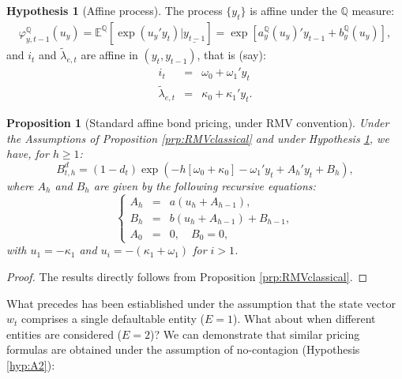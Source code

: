 \documentclass[
  12pt,
]{book}
\newtheorem{proposition}{Proposition}[chapter]
\theoremstyle{definition}
\theoremstyle{definition}
\theoremstyle{definition}
\theoremstyle{definition}
\newtheorem{hypothesis}{Hypothesis}[chapter]
\theoremstyle{remark}
\begin{document}
\begin{hypothesis}[Affine process]
\protect\hypertarget{hyp:A6}{}\label{hyp:A6}The process \(\{ y_t \}\) is affine under the \(\mathbb{Q}\) measure:
\begin{equation}
\begin{array}{lll}
\varphi^{\mathbb{Q}}_{y, t-1} (u_y) = \mathbb{E}^{\mathbb{Q}} \left[\exp( u_y ' y_t )   |   \underline{y_{t-1}} \right]
= \exp \left[ a^{\mathbb{Q}}_{y} (u_{y}) ' y_{t-1} + b^{\mathbb{Q}}_{y} (u_{y}) \right],
\end{array}\label{eq:affineyPcLT}
\end{equation}
and \(i_t\) and \(\widetilde{\lambda}_{e, t}\) are affine in \((y_t, y_{t-1})\), that is (say):
\begin{eqnarray}
i_{t} &=& \omega_0 + \omega_{1} ' y_{t} \\
\widetilde{\lambda}_{e, t} &=& \kappa_{0} + \kappa_{1}' y_t.
\end{eqnarray}
\end{hypothesis}

\begin{proposition}[Standard affine bond pricing, under RMV convention]
\protect\hypertarget{prp:standardCreditFormula}{}\label{prp:standardCreditFormula}Under the Assumptions of Proposition \ref{prp:RMVclassical} and under Hypothesis \ref{hyp:A6}, we have, for \(h \ge 1\):
\begin{equation}
B_{t,h}^d = \left(1 - d_{t} \right)\exp(- h[\omega_0 + \kappa_{0}] - \omega_{1} ' y_{t} + A_h'y_t + B_h),\label{eq:standardAffineCredit}
\end{equation}
where \(A_h\) and \(B_h\) are given by the following recursive equations:
\begin{equation}
\left\{
\begin{array}{ccl}
A_{h} &=& a(u_{h} + A_{h-1}), \\
B_{h} &=& b(u_{h} + A_{h-1}) + B_{h-1}, \\
A_{0} &=& 0,\quad  B_{0} = 0,
\end{array}
\right.\label{eq:auxRecursiveStandardCredit}
\end{equation}
with \(u_1 = -\kappa_{1}\) and \(u_i = -(\kappa_{1} + \omega_{1})\) for \(i>1\).
\end{proposition}

\begin{proof}
The results directly follows from Proposition \ref{prp:RMVclassical}.
\end{proof}

What precedes has been estiablished under the assumption that the state vector \(w_t\) comprises a single defaultable entity (\(E=1\)). What about when different entities are considered (\(E = 2\))? We can demonstrate that similar pricing formulas are obtained under the assumption of no-contagion (Hypothesis \ref{hyp:A2}):
\end{document}
